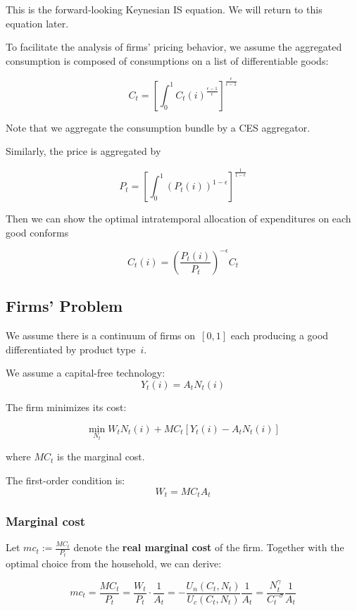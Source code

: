 \documentclass[10pt,a4]{article}
\begin{document}
This is the forward-looking Keynesian IS equation. We will return to
this equation later.~

\par\null

To facilitate the analysis of firms' pricing behavior, we assume the aggregated consumption is composed of consumptions on a list of differentiable goods:

$$ C_t =\left[\int_0^1 C_t(i) ^{\frac{\epsilon-1}{\epsilon}}\right]^{\frac{\epsilon}{\epsilon-1}}$$

Note that we aggregate the consumption bundle by a CES aggregator. 

Similarly, the price is aggregated by 

$$P_t = \left[\int_0^1(P_t(i))^{1-\epsilon}\right]^{\frac{1}{1-\epsilon}}$$

Then we can show the optimal intratemporal allocation of expenditures on each good conforms

$$ C_t(i) = \left(\frac{P_t(i)}{P_t}\right)^{-\epsilon}C_t $$

\subsection{Firms' Problem}

{\label{147524}}

We assume there is a continuum of firms on~\([0,1]\) each
producing a good differentiated by product type~\(i\).

We assume a capital-free technology:
$$ Y_t(i) = A_t N_t(i) $$

The firm minimizes its cost:

$$ \min_{N_t} W_tN_t(i) + MC_t[Y_t(i) - A_tN_t(i)]$$

where $MC_t$ is the marginal cost. 

The first-order condition is:
$$ W_t = MC_t A_t $$

\subsubsection{Marginal cost}

{\label{594939}}\par\null

Let $\displaystyle mc_t := \frac{MC_t}{P_t}$ denote the \textbf{real marginal cost} of the firm. Together with the optimal choice from the household, we can derive:

$$ mc_t = \frac{MC_t}{P_t} = \frac{W_t}{P_t}\cdot\frac{1}{A_t} = -\frac{U_n(C_t,N_t)}{U_c(C_t,N_t)}\frac{1}{A_t} = \frac{N_t^{\gamma}}{C_t^{-\sigma}}\frac{1}{A_t}$$
\end{document}
